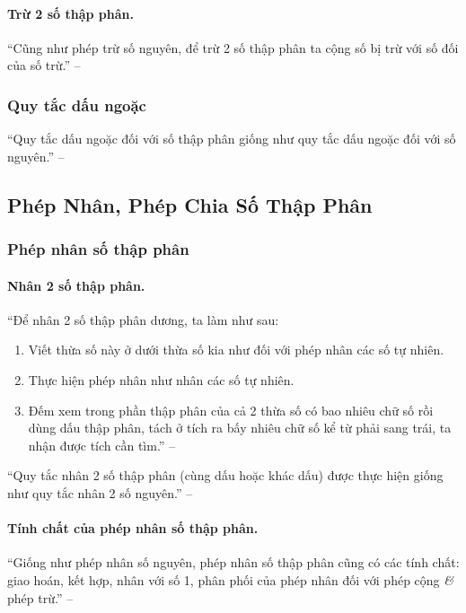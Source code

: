 \documentclass{article}
\numberwithin{equation}{section}
\begin{document}
\paragraph{Trừ 2 số thập phân.} ``Cũng như phép trừ số nguyên, để trừ 2 số thập phân ta cộng số bị trừ với số đối của số trừ.'' -- \cite[p. 50]{Thai_Anh_Dat_Ha_Loan_Nam_Quang_Toan_6_tap_2}

\subsubsection{Quy tắc dấu ngoặc}
``Quy tắc dấu ngoặc đối với số thập phân giống như quy tắc dấu ngoặc đối với số nguyên.'' -- \cite[p. 50]{Thai_Anh_Dat_Ha_Loan_Nam_Quang_Toan_6_tap_2}

\subsection{Phép Nhân, Phép Chia Số Thập Phân}

\subsubsection{Phép nhân số thập phân}

\paragraph{Nhân 2 số thập phân.} ``Để nhân 2 số thập phân dương, ta làm như sau:
\begin{enumerate}
	\item Viết thừa số này ở dưới thừa số kia như đối với phép nhân các số tự nhiên.
	\item Thực hiện phép nhân như nhân các số tự nhiên.
	\item Đếm xem trong phần thập phân của cả 2 thừa số có bao nhiêu chữ số rồi dùng dấu thập phân, tách ở tích ra bấy nhiêu chữ số kể từ phải sang trái, ta nhận được tích cần tìm.'' -- \cite[p. 52]{Thai_Anh_Dat_Ha_Loan_Nam_Quang_Toan_6_tap_2}
\end{enumerate}
``Quy tắc nhân 2 số thập phân (cùng dấu hoặc khác dấu) được thực hiện giống như quy tắc nhân 2 số nguyên.'' -- \cite[p. 52]{Thai_Anh_Dat_Ha_Loan_Nam_Quang_Toan_6_tap_2}

\paragraph{Tính chất của phép nhân số thập phân.} ``Giống như phép nhân số nguyên, phép nhân số thập phân cũng có các tính chất: giao hoán, kết hợp, nhân với số 1, phân phối của phép nhân đối với phép cộng \textit{\&} phép trừ.'' -- \cite[p. 53]{Thai_Anh_Dat_Ha_Loan_Nam_Quang_Toan_6_tap_2}
\end{document}
